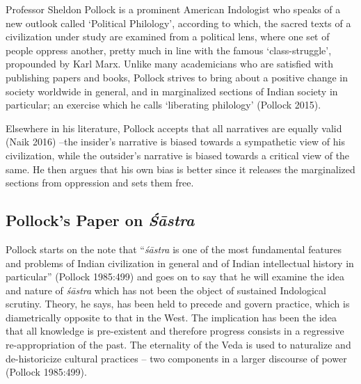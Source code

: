 Professor Sheldon Pollock is a prominent American Indologist who speaks of a new outlook called `Political Philology', according to which, the sacred texts of a civilization under study are examined from a political lens, where one set of people oppress another, pretty much in line with the famous `class-struggle', propounded by Karl Marx. Unlike many academicians who are satisﬁed with publishing papers and books, Pollock strives to bring about a positive change in society worldwide in general, and in marginalized sections of Indian society in particular; an exercise which he calls `liberating philology' (Pollock 2015).

Elsewhere in his literature, Pollock accepts that all narratives are equally valid (Naik 2016) --the insider's narrative is biased towards a sympathetic view of his civilization, while the outsider's narrative is biased towards a critical view of the same. He then argues that his own bias is better since it releases the marginalized sections from oppression and sets them free.

\subsection{Pollock's Paper on {{\sl\bfseries Śāstra}\relax}}\label{art12-sec3.1}

Pollock starts on the note that ``{\sl śāstra} is one of the most fundamental features and problems of Indian civilization in general and of Indian intellectual history in particular'' (Pollock 1985:499) and goes on to say that he will examine the idea and nature of {\sl śāstra} which has not been the object of sustained Indological scrutiny. Theory, he says, has been held to precede and govern practice, which is diametrically opposite to that in the West. The implication has been the idea that all knowledge is pre-existent and therefore progress consists in a regressive re-appropriation of the past. The eternality of the Veda is used to naturalize and de-historicize cultural practices -- two components in a larger discourse of power (Pollock 1985:499).

